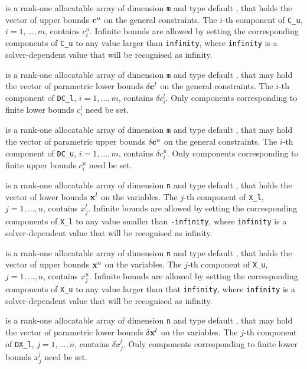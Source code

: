 \documentclass{galahad}
\begin{document}
\begin{description}
 is a rank-one allocatable array of dimension {\tt m} and type
default \realdp, that holds the vector of upper bounds ${\mathbf{c}}^{u}$
on the general constraints. The $i$-th component of
{\tt C\_u}, $i = 1,  \ldots ,  m$, contains $c_{i}^{u}$.
Infinite bounds are allowed by setting the corresponding
components of {\tt C\_u} to any value larger than {\tt infinity},
where {\tt infinity} is a  solver-dependent value that will be recognised as
infinity.

 is a rank-one allocatable array of dimension {\tt m} and type
default \realdp, that may hold the vector of parametric lower bounds
$\delta {\mathbf{c}}^{l}$ on the general constraints. The $i$-th component of
{\tt DC\_l}, $i = 1, \ldots , m$, contains $\delta c_{i}^{l}$.
Only components corresponding to finite lower bounds $c_{i}^{l}$
need be set.

 is a rank-one allocatable array of dimension {\tt m} and type
default \realdp, that may hold the vector of parametric upper bounds
$\delta {\mathbf{c}}^{u}$  on the general constraints. The $i$-th component of
{\tt DC\_u}, $i = 1,  \ldots ,  m$, contains $\delta c_{i}^{u}$.
Only components corresponding to finite upper bounds $c_{i}^{u}$
need be set.

 is a rank-one allocatable array of dimension {\tt n} and type
default \realdp, that holds
the vector of lower bounds ${\mathbf{x}}^{l}$ on the variables.
The $j$-th component of {\tt X\_l}, $j = 1, \ldots , n$,
contains $x_{j}^{l}$.
Infinite bounds are allowed by setting the corresponding
components of {\tt X\_l} to any value smaller than {\tt -infinity},
where {\tt infinity} is a  solver-dependent value that will be recognised as
infinity.

 is a rank-one allocatable array of dimension {\tt n} and type
default \realdp, that holds
the vector of upper bounds ${\mathbf{x}}^{u}$ on the variables.
The $j$-th component of {\tt X\_u}, $j = 1, \ldots , n$,
contains $x_{j}^{u}$.
Infinite bounds are allowed by setting the corresponding
components of {\tt X\_u} to any value larger than that {\tt infinity},
where {\tt infinity} is a  solver-dependent value that will be recognised as
infinity.

 is a rank-one allocatable array of dimension {\tt n} and type
default \realdp, that may hold the vector of parametric lower bounds
$\delta {\mathbf{x}}^{l}$ on the variables. The $j$-th component of
{\tt DX\_l}, $j = 1, \ldots , n$, contains $\delta x_{j}^{l}$.
Only components corresponding to finite lower bounds $x_{j}^{l}$
need be set.


\end{description}
\end{document}
